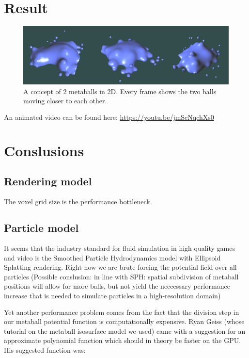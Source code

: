 \documentclass{article}
\begin{document}
    \section{Result}
        \begin{figure}[ht]
            \includegraphics[width=\linewidth]{img/result-animation.png}
            \caption{A concept of 2 metaballs in 2D. Every frame shows the two balls moving closer to each other.}
            \label{fig:result-animation}
        \end{figure}

        An animated video can be found here:
        \url{https://youtu.be/jmScNqchXs0}

    \section{Conslusions}
    
        \subsection{Rendering model}
        The voxel grid size is the performance bottleneck.

        \subsection{Particle model}
    	It seems that the industry standard for fluid simulation in high quality games and video is the Smoothed Particle Hydrodynamics model with Ellipsoid Splatting rendering.
        Right now we are brute forcing the potential field over all particles
        (Possible conslusion: in line with SPH: spatial subdivision of metaball positions will allow for more balls, but not yield the neccessary performance increase that is needed to simulate particles in a high-resolution domain)

        Yet another performance problem comes from the fact that the division step in our metaball potential function is computationally expensive.
        Ryan Geiss (whose tutorial on the metaball isosurface model we used) came with a suggestion for an approximate polynomial function which should in theory be faster on the GPU. His suggested function was:
\end{document}
